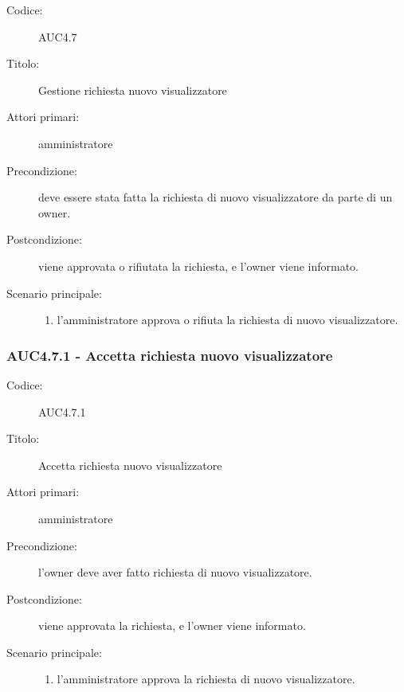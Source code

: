\documentclass[casi-duso]{subfiles}
\begin{document}
\begin{description}
  \item[Codice:] AUC4.7
  \item[Titolo:] Gestione richiesta nuovo visualizzatore
  \item[Attori primari:] amministratore
  \item[Precondizione:] deve essere stata fatta la richiesta di nuovo visualizzatore da parte di un owner.
  \item[Postcondizione:] viene approvata o rifiutata la richiesta, e l'owner viene informato.
  \item[Scenario principale:]
  \begin{enumerate}
    \item l'amministratore approva o rifiuta la richiesta di nuovo visualizzatore.
  \end{enumerate}
\end{description}

\subsubsection{AUC4.7.1 - Accetta richiesta nuovo visualizzatore}%
\label{subsub:AUC4.7.1}
\begin{description}
  \item[Codice:] AUC4.7.1
  \item[Titolo:] Accetta richiesta nuovo visualizzatore
  \item[Attori primari:] amministratore
  \item[Precondizione:] l'owner deve aver fatto richiesta di nuovo visualizzatore.
  \item[Postcondizione:] viene approvata la richiesta, e l'owner viene informato.
  \item[Scenario principale:]
  \begin{enumerate}
    \item l'amministratore approva la richiesta di nuovo visualizzatore.
  \end{enumerate}
\end{description}  
\end{document}
